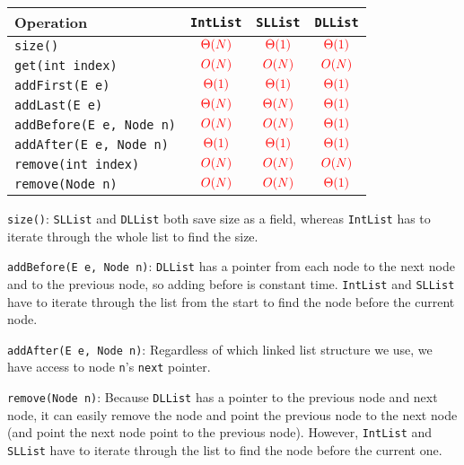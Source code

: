 \begin{solution}
\renewcommand{\arraystretch}{2}
\setlength{\tabcolsep}{16pt}
\begin{tabularx}{\textwidth}{Xccc}
Operation                          & \lstinline$IntList$    & \lstinline$SLList$     & \lstinline$DLList$     \\ \hline
\lstinline$size()$                 & $\color{red}\Theta(N)$ & $\color{red}\Theta(1)$ & $\color{red}\Theta(1)$ \\
\lstinline$get(int index)$         & $\color{red}O(N)$      & $\color{red}O(N)$      & $\color{red}O(N)$      \\
\lstinline$addFirst(E e)$          & $\color{red}\Theta(1)$ & $\color{red}\Theta(1)$ & $\color{red}\Theta(1)$ \\
\lstinline$addLast(E e)$           & $\color{red}\Theta(N)$ & $\color{red}\Theta(N)$ & $\color{red}\Theta(1)$ \\
\lstinline$addBefore(E e, Node n)$ & $\color{red}O(N)$      & $\color{red}O(N)$      & $\color{red}\Theta(1)$ \\
\lstinline$addAfter(E e, Node n)$  & $\color{red}\Theta(1)$ & $\color{red}\Theta(1)$ & $\color{red}\Theta(1)$ \\
\lstinline$remove(int index)$      & $\color{red}O(N)$      & $\color{red}O(N)$      & $\color{red}O(N)$      \\
\lstinline$remove(Node n)$         & $\color{red}O(N)$      & $\color{red}O(N)$      & $\color{red}\Theta(1)$ \\
\end{tabularx}

\lstinline$size()$: \lstinline$SLList$ and \lstinline$DLList$ both save size as
a field, whereas \lstinline$IntList$ has to iterate through the whole list to
find the size.

\lstinline$addBefore(E e, Node n)$: \lstinline$DLList$ has a pointer from each
node to the next node and to the previous node, so adding before is constant
time. \lstinline$IntList$ and \lstinline$SLList$ have to iterate through the
list from the start to find the node before the current node.

\lstinline$addAfter(E e, Node n)$: Regardless of which linked list structure we use,
we have access to node \lstinline{n}'s \lstinline{next} pointer.

\lstinline$remove(Node n)$: Because \lstinline$DLList$ has a pointer to the
previous node and next node, it can easily remove the node and point the
previous node to the next node (and point the next node point to the previous
node). However, \lstinline$IntList$ and \lstinline$SLList$ have to iterate
through the list to find the node before the current one.
\end{solution}

